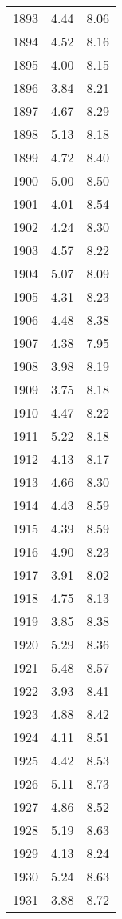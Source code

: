 \begin{longtable}{lrr}
1893 &    4.44 &    8.06 \\
1894 &    4.52 &    8.16 \\
1895 &    4.00 &    8.15 \\
1896 &    3.84 &    8.21 \\
1897 &    4.67 &    8.29 \\
1898 &    5.13 &    8.18 \\
1899 &    4.72 &    8.40 \\
1900 &    5.00 &    8.50 \\
1901 &    4.01 &    8.54 \\
1902 &    4.24 &    8.30 \\
1903 &    4.57 &    8.22 \\
1904 &    5.07 &    8.09 \\
1905 &    4.31 &    8.23 \\
1906 &    4.48 &    8.38 \\
1907 &    4.38 &    7.95 \\
1908 &    3.98 &    8.19 \\
1909 &    3.75 &    8.18 \\
1910 &    4.47 &    8.22 \\
1911 &    5.22 &    8.18 \\
1912 &    4.13 &    8.17 \\
1913 &    4.66 &    8.30 \\
1914 &    4.43 &    8.59 \\
1915 &    4.39 &    8.59 \\
1916 &    4.90 &    8.23 \\
1917 &    3.91 &    8.02 \\
1918 &    4.75 &    8.13 \\
1919 &    3.85 &    8.38 \\
1920 &    5.29 &    8.36 \\
1921 &    5.48 &    8.57 \\
1922 &    3.93 &    8.41 \\
1923 &    4.88 &    8.42 \\
1924 &    4.11 &    8.51 \\
1925 &    4.42 &    8.53 \\
1926 &    5.11 &    8.73 \\
1927 &    4.86 &    8.52 \\
1928 &    5.19 &    8.63 \\
1929 &    4.13 &    8.24 \\
1930 &    5.24 &    8.63 \\
1931 &    3.88 &    8.72 \\

\end{longtable}
